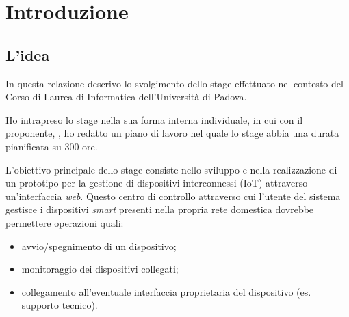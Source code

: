 
\chapter{Introduzione}
\label{cap:introduzione}

%
%

\section{L'idea}



In questa relazione descrivo lo svolgimento dello stage effettuato nel contesto del Corso di Laurea di Informatica dell'Università di Padova.

Ho intrapreso lo stage nella sua forma interna individuale, in cui con il proponente, \profTitle \myProf, ho redatto un piano di lavoro nel quale lo stage abbia una durata pianificata su 300 ore.

L'obiettivo principale dello stage consiste nello sviluppo e nella realizzazione di un prototipo per la gestione di dispositivi interconnessi (IoT) attraverso un'interfaccia \emph{web}.
Questo centro di controllo attraverso cui l'utente del sistema gestisce i dispositivi \emph{smart} presenti nella propria rete domestica dovrebbe permettere operazioni quali:
\begin{itemize}
  \item avvio/spegnimento di un dispositivo;
  \item monitoraggio dei dispositivi collegati;
  \item collegamento all'eventuale interfaccia proprietaria del dispositivo (es. supporto tecnico).
\end{itemize}

